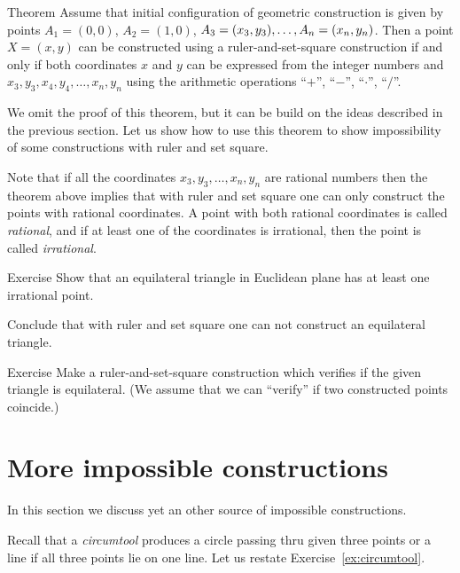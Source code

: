 \begin{thm}{Theorem}
Assume that initial configuration of geometric construction is given by points $A_1=(0,0)$, $A_2=(1,0)$, $A_3=(x_3,y_3),\z\dots,A_n=(x_n,y_n)$.
Then a point $X=(x,y)$ can be constructed using a ruler-and-set-square construction
if and only if both coordinates $x$ and $y$ can be expressed from the integer numbers and $x_3,y_3,x_4,y_4,\dots,x_n,y_n$ using the arithmetic operations ``$+$'', ``$-$'', ``$\cdot$'', ``$/$''. 
\end{thm}

We omit the proof of this theorem, but it can be build on the ideas described in the previous section. 
Let us show how to use this theorem to show impossibility of some constructions with ruler and set square.

Note that if all the coordinates $x_3,y_3,\dots,x_n,y_n$ are rational numbers then the theorem above implies that with ruler and set square one can only construct the points with rational coordinates.
A point with both rational coordinates is called \emph{rational},
and if at least one of the coordinates is irrational, then the point is called \emph{irrational}.

\begin{thm}{Exercise}\label{ex:equilateral triangle}
Show that an equilateral triangle in Euclidean plane has at least one irrational point.

Conclude that with ruler and set square one can not construct an equilateral triangle.
\end{thm}


\begin{thm}{Exercise}\label{ex:equilateral triangle-verify}
Make a ruler-and-set-square construction which verifies if the given triangle is  equilateral.
(We assume that we can ``verify'' if two constructed points coincide.) 
\end{thm}


\section*{More impossible constructions}

In this section we discuss yet an other source of impossible constructions. 

Recall that a \emph{circumtool} produces a circle passing thru given three points
or a line if all three points lie on one line.
Let us restate Exercise~\ref{ex:circumtool}.

